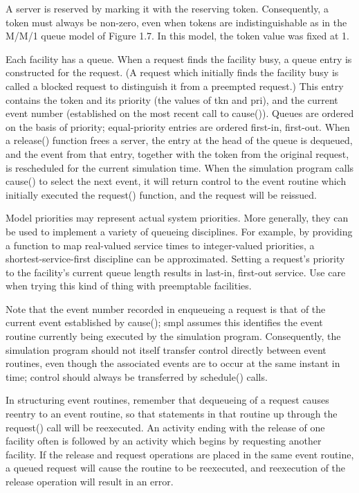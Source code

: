 A server is reserved by marking it with the reserving token. Consequently, a
token must always be non-zero, even when tokens are indistinguishable as in
the M/M/1 queue model of Figure 1.7. In this model, the token value was fixed
at 1.

Each facility has a queue. When a request finds the facility busy, a queue
entry is constructed for the request. (A request which initially finds the
facility busy is called a blocked request to distinguish it from a preempted
request.) This entry contains the token and its priority (the values of tkn
and pri), and the current event number (established on the most recent call to
cause()). Queues are ordered on the basis of priority; equal-priority entries
are ordered first-in, first-out. When a release() function frees a server, the
entry at the head of the queue is dequeued, and the event from that entry,
together with the token from the original request, is rescheduled for the
current simulation time. When the simulation program calls cause() to select
the next event, it will return control to the event routine which initially
executed the request() function, and the request will be reissued.

Model priorities may represent actual system priorities. More generally, they
can be used to implement a variety of queueing disciplines. For example, by
providing a function to map real-valued service times to integer-valued
priorities, a shortest-service-first discipline can be approximated. Setting a
request's priority to the facility's current queue length results in
last-in, first-out service. Use care when trying this kind of thing with
preemptable facilities.

Note that the event number recorded in enqueueing a request is that of the
current event established by cause(); smpl assumes this identifies the event
routine currently being executed by the simulation program. Consequently, the
simulation program should not itself transfer control directly between event
routines, even though the associated events are to occur at the same instant
in time; control should always be transferred by schedule() calls.

In structuring event routines, remember that dequeueing of a request causes
reentry to an event routine, so that statements in that routine up through the
request() call will be reexecuted. An activity ending with the release of one
facility often is followed by an activity which begins by requesting another
facility. If the release and request operations are placed in the same event
routine, a queued request will cause the routine to be reexecuted, and
reexecution of the release operation will result in an error.

